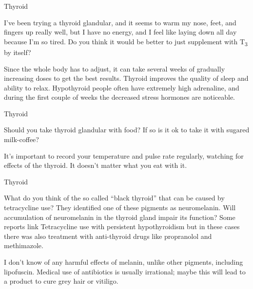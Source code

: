 \documentclass[11pt,oneside,openany,extrafontsizes]{memoir}
\begin{document}
\begin{qaexchange}{Thyroid}

    \begin{question}
        I've been trying a thyroid glandular, and it seems to warm my nose, feet, and fingers up really well, but I have no energy, and I feel like laying down all day because I'm so tired. Do you think it would be better to just supplement with T\textsubscript{3} by itself?
    \end{question}

    \begin{answer}
        Since the whole body has to adjust, it can take several weeks of gradually increasing doses to get the best results. Thyroid improves the quality of sleep and ability to relax. Hypothyroid people often have extremely high adrenaline, and during the first couple of weeks the decreased stress hormones are noticeable.
    \end{answer}
\end{qaexchange}

\begin{qaexchange}{Thyroid}

    \begin{question}
        Should you take thyroid glandular with food? If so is it ok to take it with sugared milk-coffee?
    \end{question}

    \begin{answer}
        It's important to record your temperature and pulse rate regularly, watching for effects of the thyroid. It doesn't matter what you eat with it.
    \end{answer}
\end{qaexchange}

\begin{emailexchange}{Thyroid}

    \begin{question}
        What do you think of the so called \enquote{black thyroid} that can be caused by tetracycline use? They identified one of these pigments as neuromelanin. Will accumulation of neuromelanin in the thyroid gland impair its function? Some reports link Tetracycline use with persistent hypothyroidism but in these cases there was also treatment with anti-thyroid drugs like propranolol and methimazole.
    \end{question}

    \begin{answer}
        I don't know of any harmful effects of melanin, unlike other pigments, including lipofuscin. Medical use of antibiotics is usually irrational; maybe this will lead to a product to cure grey hair or vitiligo.
    \end{answer}
\end{emailexchange}
\end{document}
